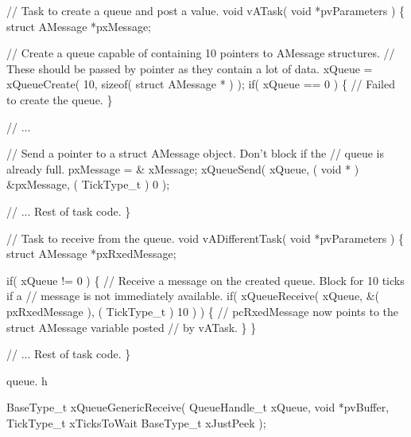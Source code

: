 \begin{DoxyPre}// Task to create a queue and post a value.
void vATask( void *pvParameters )
\{
struct AMessage *pxMessage;\end{DoxyPre}



\begin{DoxyPre}   // Create a queue capable of containing 10 pointers to AMessage structures.
   // These should be passed by pointer as they contain a lot of data.
   xQueue = xQueueCreate( 10, sizeof( struct AMessage * ) );
   if( xQueue == 0 )
   \{
    // Failed to create the queue.
   \}\end{DoxyPre}



\begin{DoxyPre}   // ...\end{DoxyPre}



\begin{DoxyPre}   // Send a pointer to a struct AMessage object.  Don't block if the
   // queue is already full.
   pxMessage = \& xMessage;
   xQueueSend( xQueue, ( void * ) \&pxMessage, ( TickType\_t ) 0 );\end{DoxyPre}



\begin{DoxyPre}   // ... Rest of task code.
\}\end{DoxyPre}



\begin{DoxyPre}// Task to receive from the queue.
void vADifferentTask( void *pvParameters )
\{
struct AMessage *pxRxedMessage;\end{DoxyPre}



\begin{DoxyPre}   if( xQueue != 0 )
   \{
    // Receive a message on the created queue.  Block for 10 ticks if a
    // message is not immediately available.
    if( xQueueReceive( xQueue, \&( pxRxedMessage ), ( TickType\_t ) 10 ) )
    \{
        // pcRxedMessage now points to the struct AMessage variable posted
        // by vATask.
    \}
   \}\end{DoxyPre}



\begin{DoxyPre}   // ... Rest of task code.
\}
\end{DoxyPre}


queue. h 
\begin{DoxyPre}
BaseType\_t xQueueGenericReceive(
                                   QueueHandle\_t    xQueue,
                                   void *pvBuffer,
                                   TickType\_t   xTicksToWait
                                   BaseType\_t   xJustPeek
                                );\end{DoxyPre}


